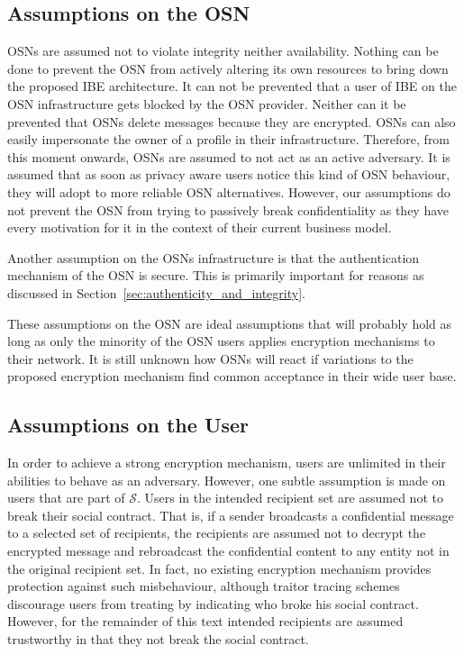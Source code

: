 \subsection{Assumptions on the OSN}
OSNs are assumed not to violate integrity neither availability. Nothing can be done to prevent the OSN from actively altering its own resources to bring down the proposed IBE architecture. It can not be prevented that a user of IBE on the OSN infrastructure gets blocked by the OSN provider. Neither can it be prevented that OSNs delete messages because they are encrypted. OSNs can also easily impersonate the owner of a profile in their infrastructure. Therefore, from this moment onwards, OSNs are assumed to not act as an active adversary. It is assumed that as soon as privacy aware users notice this kind of OSN behaviour, they will adopt to more reliable OSN alternatives. However, our assumptions do not prevent the OSN from trying to passively break confidentiality as they have every motivation for it in the context of their current business model.

Another assumption on the OSNs infrastructure is that the authentication mechanism of the OSN is secure. This is primarily important for reasons as discussed in Section~\ref{sec:authenticity_and_integrity}.

These assumptions on the OSN are ideal assumptions that will probably hold as long as only the minority of the OSN users applies encryption mechanisms to their network. It is still unknown how OSNs will react if variations to the proposed encryption mechanism find common acceptance in their wide user base.

\subsection{Assumptions on the User}

In order to achieve a strong encryption mechanism, users are unlimited in their abilities to behave as an adversary. However, one subtle assumption is made on users that are part of $\mathcal{S}$. Users in the intended recipient set are assumed not to break their social contract. That is, if a sender broadcasts a confidential message to a selected set of recipients, the recipients are assumed not to decrypt the encrypted message and rebroadcast the confidential content to any entity not in the original recipient set. In fact, no existing encryption mechanism provides protection against such misbehaviour, although traitor tracing schemes~\cite{art:ChorFNP00} discourage users from treating by indicating who broke his social contract. However, for the remainder of this text intended recipients are assumed trustworthy in that they not break the social contract.

